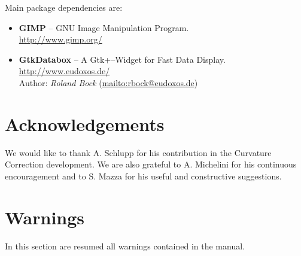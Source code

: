 \documentclass[a4paper,11pt]{article}
\makeatletter
\newcommand{\listofwarnings}{
\section{Warnings}

In this section are resumed all warnings contained in the manual.

\vspace{0.3cm}
\@starttoc{low}
}
\makeatother
\begin{document}
Main package dependencies are:

\begin{itemize}
\item {\bfseries GIMP} -- GNU Image Manipulation Program. \\
	\url{http://www.gimp.org/}
\item {\bfseries GtkDatabox} -- A Gtk+--Widget for Fast Data Display. \url{http://www.eudoxos.de/}\\
	Author:  {\itshape Roland Bock} (\url{mailto:rbock@eudoxos.de})
\end{itemize}


\section{Acknowledgements}

We would like to thank A. Schlupp for his contribution
in the Curvature Correction development.
We are also grateful to A. Michelini for his continuous encouragement
and to S. Mazza for his useful and constructive suggestions.


\listofwarnings

\listoffigures


% 
\newpage


\printindex
\end{document}
